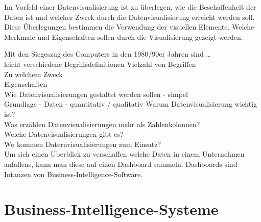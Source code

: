 Im Vorfeld einer Datenvisualisierung ist zu überlegen, wie die Beschaffenheit der Daten ist und welcher Zweck durch die Datenvisualisierung erreicht werden soll.
Diese Überlegungen bestimmen die Verwendung der visuellen Elemente. 
Welche Merkmale und Eigenschaften sollen durch die Visualisierung gezeigt werden.\cite[Vgl.][17]{kirk_data_2019}

Mit den Siegeszug des Computers in den 1980/90er Jahren sind \dots\\
leicht verschiedene Begriffsdefinitionen
Vielzahl von Begriffen\\ 
Zu welchem Zweck\\
Eigenschaften\\
Wie Datenvisualisierungen gestaltet werden sollen - simpel\\
Grundlage - Daten - quantitativ / qualitativ
Warum Datenvisualisierung wichtig ist?\\
Was erzählen Datenvisualisierungen mehr als Zahlenkolonnen?\\
Welche Datenvisualisierungen gibt es?\\
Wo kommen Daternvisualisierungen zum Einsatz?\\

Um sich einen Überblick zu verschaffen welche Daten in einem Unternehmen anfallens, kann man diese auf einen Dashboard sammeln.
Dashboards sind Intanzen von Business-Intelligence-Software.





\clearpage
\section{Business-Intelligence-Systeme}

